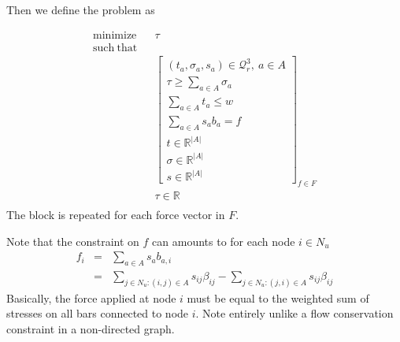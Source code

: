 \documentclass{article}
\begin{document}
Then we define the problem as 

\begin{eqnarray}
    \mathrm{minimize} &&  \tau \\
    \mathrm{such\ that} \\
    && \left[
        \begin{array}{l}
            (t_a,\sigma_a,s_a)\in\mathcal{Q}^3_r,\ a\in A\\
            \displaystyle \tau \geq \sum_{a\in A} \sigma_a \\
            \displaystyle \sum_{a\in A} t_a \leq w \\
            \displaystyle \sum_{a\in A} s_a b_a = f \\
            t\in\mathbb{R}^{|A|}\\
            \sigma\in\mathbb{R}^{|A|} \\
            s\in\mathbb{R}^{|A|} 
        \end{array}
    \right]_{f\in F} \\
    && \tau\in\mathbb{R}\\
\end{eqnarray}
The block is repeated for each force vector in $F$.

Note that the constraint on $f$ can amounts to for each node $i\in N_u$
\begin{eqnarray}
    f_i & = & \sum_{a\in A} s_{a} b_{a,i} \\
        & = & \sum_{j\in N_u:(i,j)\in A} s_{ij} \beta_{ij} 
            - \sum_{j\in N_u:(j,i)\in A} s_{ij} \beta_{ij}
\end{eqnarray}
Basically, the force applied at node $i$ must be equal to the weighted sum of
stresses on all bars connected to node $i$. Note entirely unlike a flow
conservation constraint in a non-directed graph.
\end{document}

